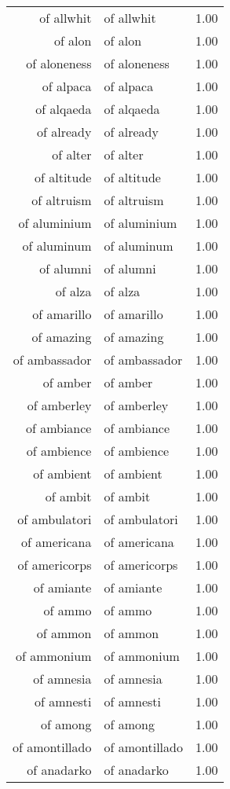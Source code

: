 \begin{table}[ht]
\begin{tabular}{rlr}
  of allwhit & of allwhit & 1.00 \\ 
  of alon & of alon & 1.00 \\ 
  of aloneness & of aloneness & 1.00 \\ 
  of alpaca & of alpaca & 1.00 \\ 
  of alqaeda & of alqaeda & 1.00 \\ 
  of already & of already & 1.00 \\ 
  of alter & of alter & 1.00 \\ 
  of altitude & of altitude & 1.00 \\ 
  of altruism & of altruism & 1.00 \\ 
  of aluminium & of aluminium & 1.00 \\ 
  of aluminum & of aluminum & 1.00 \\ 
  of alumni & of alumni & 1.00 \\ 
  of alza & of alza & 1.00 \\ 
  of amarillo & of amarillo & 1.00 \\ 
  of amazing & of amazing & 1.00 \\ 
  of ambassador & of ambassador & 1.00 \\ 
  of amber & of amber & 1.00 \\ 
  of amberley & of amberley & 1.00 \\ 
  of ambiance & of ambiance & 1.00 \\ 
  of ambience & of ambience & 1.00 \\ 
  of ambient & of ambient & 1.00 \\ 
  of ambit & of ambit & 1.00 \\ 
  of ambulatori & of ambulatori & 1.00 \\ 
  of americana & of americana & 1.00 \\ 
  of americorps & of americorps & 1.00 \\ 
  of amiante & of amiante & 1.00 \\ 
  of ammo & of ammo & 1.00 \\ 
  of ammon & of ammon & 1.00 \\ 
  of ammonium & of ammonium & 1.00 \\ 
  of amnesia & of amnesia & 1.00 \\ 
  of amnesti & of amnesti & 1.00 \\ 
  of among & of among & 1.00 \\ 
  of amontillado & of amontillado & 1.00 \\ 
  of anadarko & of anadarko & 1.00 \\ 

\end{tabular}
\end{table}
